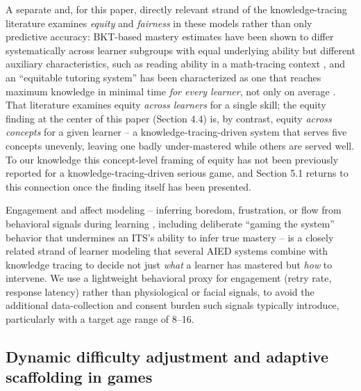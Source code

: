 \documentclass[11pt]{article}
\begin{document}
A separate and, for this paper, directly relevant strand of the knowledge-tracing literature examines \textit{equity} and \textit{fairness} in these models rather than only predictive accuracy: BKT-based mastery estimates have been shown to differ systematically across learner subgroups with equal underlying ability but different auxiliary characteristics, such as reading ability in a math-tracing context \cite{ref34,ref35}, and an ``equitable tutoring system'' has been characterized as one that reaches maximum knowledge in minimal time \textit{for every learner}, not only on average \cite{ref34}. That literature examines equity \textit{across learners} for a single skill; the equity finding at the center of this paper (Section 4.4) is, by contrast, equity \textit{across concepts} for a given learner -- a knowledge-tracing-driven system that serves five concepts unevenly, leaving one badly under-mastered while others are served well. To our knowledge this concept-level framing of equity has not been previously reported for a knowledge-tracing-driven serious game, and Section 5.1 returns to this connection once the finding itself has been presented.

Engagement and affect modeling -- inferring boredom, frustration, or flow from behavioral signals during learning \cite{ref20}, including deliberate ``gaming the system'' behavior that undermines an ITS's ability to infer true mastery \cite{ref21} -- is a closely related strand of learner modeling that several AIED systems combine with knowledge tracing to decide not just \textit{what} a learner has mastered but \textit{how} to intervene. We use a lightweight behavioral proxy for engagement (retry rate, response latency) rather than physiological or facial signals, to avoid the additional data-collection and consent burden such signals typically introduce, particularly with a target age range of 8--16.

\subsection{Dynamic difficulty adjustment and adaptive scaffolding in games}
\end{document}
